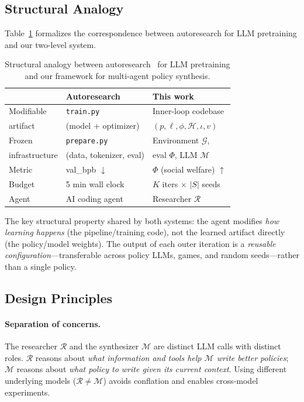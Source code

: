 \documentclass[sigconf,authordraft]{acmart}
\newcommand{\cR}{\mathcal{R}}
\newcommand{\cM}{\mathcal{M}}
\newcommand{\cG}{\mathcal{G}}
\begin{document}
\subsection{Structural Analogy}

Table~\ref{tab:analogy} formalizes the correspondence between autoresearch for LLM pretraining and our two-level system.

\begin{table}[t]
\caption{Structural analogy between autoresearch~\cite{karpathy2026} for LLM pretraining and our framework for multi-agent policy synthesis.}
\label{tab:analogy}
\centering
\small
\begin{tabular}{@{}lll@{}}
\toprule
 & Autoresearch & This work \\
\midrule
Modifiable & \texttt{train.py} & Inner-loop codebase \\
artifact & (model + optimizer) & $(p, \ell, \phi, \mathcal{H}, \iota, v)$ \\
\addlinespace
Frozen & \texttt{prepare.py} & Environment $\cG$, \\
infrastructure & (data, tokenizer, eval) & eval $\Phi$, LLM $\cM$ \\
\addlinespace
Metric & val\_bpb $\downarrow$ & $\Phi$ (social welfare) $\uparrow$ \\
\addlinespace
Budget & 5 min wall clock & $K$ iters $\times$ $|S|$ seeds \\
\addlinespace
Agent & AI coding agent & Researcher $\cR$ \\
\bottomrule
\end{tabular}
\end{table}

The key structural property shared by both systems: the agent modifies \emph{how learning happens} (the pipeline/training code), not the learned artifact directly (the policy/model weights). The output of each outer iteration is a \emph{reusable configuration}---transferable across policy LLMs, games, and random seeds---rather than a single policy.

\subsection{Design Principles}

\paragraph{Separation of concerns.}
The researcher $\cR$ and the synthesizer $\cM$ are distinct LLM calls with distinct roles. $\cR$ reasons about \emph{what information and tools help $\cM$ write better policies}; $\cM$ reasons about \emph{what policy to write given its current context}. Using different underlying models ($\cR \neq \cM$) avoids conflation and enables cross-model experiments.
\end{document}

